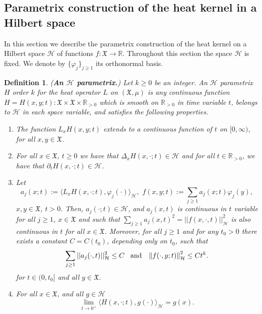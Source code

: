 \documentclass[11pt,reqno]{amsart}
\newtheorem{definition}[theorem]{Definition}
\theoremstyle{remark}
\theoremstyle{definition}
\newtheorem{remark}{Remark}
\numberwithin{theorem}{section} \numberwithin{equation}{section}
\newcommand{\R}{\mathbb{R}}
\newcommand{\X}{\mathfrak{X}}
\begin{document}

\subsection{Parametrix construction of the heat kernel in a Hilbert space}

In this section we describe the parametrix construction of the heat kernel on a Hilbert space $\mathcal{H}$ of functions $f:\X\to\R$. Throughout this section the space $\mathcal{H}$ is fixed. We denote by $\{\varphi_j\}_{j\geq 1}$ its orthonormal basis.

\begin{definition}\label{def. parametrixH} (\textbf{An $\mathcal{H}$ parametrix.})
Let $k\geq 0$ be an integer. An \emph{$\mathcal{H}$ parametrix} $H$ order $k$  for the heat operator $L$ on $(\X,\mu)$ is any continuous function $H=H(x,y;t):\X\times \X\times \mathbb{R}_{>0}$
which is smooth on $\mathbb{R}_{>0}$ in time variable $t$, belongs to $\mathcal{H}$ in each space variable, and satisfies the following properties.
\begin{enumerate}
\item The function $L_{x}H(x,y;t)$ extends to a continuous function of $t$ on  $[0,\infty)$, for all $x,y\in\X$.

 \item  For all  $x\in \X$, $t\geq0$ we have that $\Delta_{x}H(x,\cdot;t)\in\mathcal{H}$ and for all $t\in \mathbb{R}_{>0}$, we have that $\partial_t  H(x,\cdot;t)\in\mathcal{H}$.
\item Let $$a_j(x;t):= \langle L_xH(x,\cdot;t),\varphi_j(\cdot) \rangle_{\mathcal{H}},\,\, f(x,y;t):= \sum_{j\geq 1}a_j(x;t)\varphi_j(y),$$
    $x,y\in\X$, $t>0$. Then, $a_j(\cdot ;t)\in\mathcal{H}$, and $a_j(x,t)$ is continuous in $t$ variable for all $j\geq 1$, $x\in\X$ and such that $\sum_{j\geq 1}a_j(x,t)^2 =||f(x,\cdot,t)||_{\mathcal{H}}^2$ is also continuous in $t$ for all $x\in\X$. Moreover,  for all $j\geq 1$ and for any $t_0>0$ there exists a constant $C=C(t_0)$, depending only on
$t_0$, such that
$$
\sum_{j\geq 1} ||a_j(\cdot,t)||^2_{\mathcal{H}}\leq C
  \,\,\,\,\,
  \text{\rm and}
  \,\,\,\,\,
  \left\|f(\cdot, y;t)\right\|_{\mathcal{H}}^2\leq Ct^{k}.
$$
for $t \in (0, t_0]$ and all $y\in \X$.
\item For all $x\in \X$, and all $g\in \mathcal{H}$
\begin{equation}\label{eq:dirac property of heat kernel hilb}
\lim\limits_{t\rightarrow 0^+}\langle H(x,\cdot;t),g(\cdot)\rangle_{\mathcal{H}}=g(x).
\end{equation}
\end{enumerate}
\end{definition}
\end{document}

